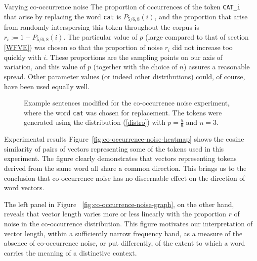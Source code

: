 \documentclass{article} %
\newcommand{\word}[1]{\texttt{#1}}
\begin{document}
\begin{section}{Varying co-occurrence noise}
The proportion of occurrences of the token \word{CAT\_i} that arise by
replacing the word \word{cat} is $P_{5/6, 8}(i)$, and the proportion
that arise from randomly interspersing this token throughout the corpus
is $r_i := 1 - P_{5/6, 8}(i)$.  The particular value of $p$ (large
compared to that of section \ref{WFVE}) was chosen so that the
proportion of noise $r_i$ did not increase too quickly with $i$.  These
proportions are the sampling points on our axis of variation, and this
value of $p$ (together with the choice of $n$) assures a reasonable
spread.  Other parameter values (or indeed other distributions) could,
of course, have been used equally well.

\begin{table}
	
	\label{fig:co-occurrence-noise-counts}
	\caption{Term frequency $tf$ of words chosen for the
          co-occurrence noise experiment. }
	\label{cooccurrence-noise-words}
\end{table}

\begin{figure}
	\begin{mdframed}
	
	\end{mdframed}
	\caption{Example sentences modified for the co-occurrence noise
          experiment, where the word \word{cat} was chosen for
          replacement.  The tokens were generated using the distribution
          (\ref{distro}) with $p = \tfrac{5}{6}$ and $n=3$.}
	\label{fig:co-occurrence-noise-experiment-text}
\end{figure}

\begin{subsection}{Experimental results}
Figure~\ref{fig:co-occurrence-noise-heatmap} shows the cosine similarity
of pairs of vectors representing some of the tokens used in this
experiment.  The figure clearly demonstrates that vectors representing
tokens derived from the same word all share a common direction.  This
brings us to the conclusion that co-occurrence noise has no discernable effect on
the direction of word vectors.


The left panel in Figure ~\ref{fig:co-occurrence-noise-graph}, on the other hand, reveals that vector length varies more or less
linearly with the proportion $r$ of noise in the co-occurrence
distribution.  This figure motivates our interpretation of vector
length, within a sufficiently narrow frequency band, as a measure of the
absence of co-occurrence noise, or put differently, of the extent to
which a word carries the meaning of a distinctive context.


\end{subsection}
\end{section}
\end{document}
